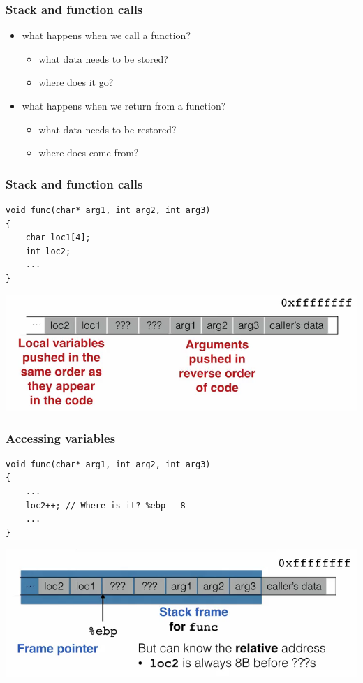 \documentclass[serif,mathserif]{beamer}
\begin{document}
\begin{frame}
  \frametitle{Stack and function calls}
  \begin{itemize}
  	\item what happens when we call a function?
  		\begin{itemize}
  			\item what data needs to be stored?
  			\item where does it go?
  		\end{itemize}
  	\item what happens when we return from a function?
  		\begin{itemize}
  			\item what data needs to be restored?
  			\item where does come from?
  		\end{itemize}
  \end{itemize}
\end{frame}


\begin{frame}[fragile]
  \frametitle{Stack and function calls}
\begin{lstlisting}
void func(char* arg1, int arg2, int arg3)
{
    char loc1[4];
    int loc2;
    ...
}
\end{lstlisting}
\begin{center}
\includegraphics[scale=0.35]{stackff.png}
\end{center}

\end{frame}


\begin{frame}[fragile]
  \frametitle{Accessing variables}
\begin{lstlisting}
void func(char* arg1, int arg2, int arg3)
{
    ...
    loc2++; // Where is it? %ebp - 8
    ...
}
\end{lstlisting}
\begin{center}
\includegraphics[scale=0.35]{stackff2.png}
\end{center}

\end{frame}
\end{document}
